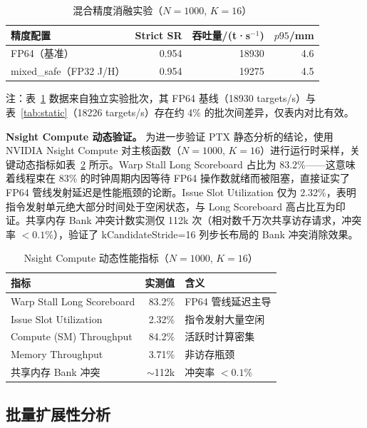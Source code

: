 \documentclass[twocolumn,a4paper,10pt]{ctexart}
\begin{document}
\begin{table}[htbp]
\centering
\caption{混合精度消融实验（$N{=}1000$, $K{=}16$）}
\label{tab:mixed}
\footnotesize
\begin{tabular}{lrrr}
\toprule
精度配置 & Strict SR & 吞吐量/(t·s$^{-1}$) & $p95$/mm\\
\midrule
FP64（基准） & 0.954 & 18930 & 4.6\\
mixed\_safe（FP32 J/H） & 0.954 & 19275 & 4.5\\
\bottomrule
\end{tabular}
\end{table}

{\footnotesize 注：表~\ref{tab:mixed} 数据来自独立实验批次，其 FP64 基线（18930 targets/s）与表~\ref{tab:static}（18226 targets/s）存在约 4\% 的批次间差异，仅表内对比有效。}

\textbf{Nsight Compute 动态验证。} 为进一步验证 PTX 静态分析的结论，使用 NVIDIA Nsight Compute\cite{ncu} 对主核函数（$N=1000$, $K=16$）进行运行时采样，关键动态指标如表~\ref{tab:ncu} 所示。Warp Stall Long Scoreboard 占比为 83.2\%——这意味着线程束在 83\% 的时钟周期内因等待 FP64 操作数就绪而被阻塞，直接证实了 FP64 管线发射延迟是性能瓶颈的论断。Issue Slot Utilization 仅为 2.32\%，表明指令发射单元绝大部分时间处于空闲状态，与 Long Scoreboard 高占比互为印证。共享内存 Bank 冲突计数实测仅 112k 次（相对数千万次共享访存请求，冲突率 $<0.1\%$），验证了 kCandidateStride=16 列步长布局的 Bank 冲突消除效果。

\begin{table}[htbp]
\centering
\caption{Nsight Compute 动态性能指标（$N{=}1000$, $K{=}16$）}
\label{tab:ncu}
\footnotesize
\begin{tabular}{lrl}
\toprule
指标 & 实测值 & 含义\\
\midrule
Warp Stall Long Scoreboard & 83.2\% & FP64 管线延迟主导\\
Issue Slot Utilization & 2.32\% & 指令发射大量空闲\\
Compute (SM) Throughput & 84.2\% & 活跃时计算密集\\
Memory Throughput & 3.71\% & 非访存瓶颈\\
共享内存 Bank 冲突 & $\sim$112k & 冲突率 $<0.1\%$\\
\bottomrule
\end{tabular}
\end{table}

\subsection{批量扩展性分析}
\end{document}
